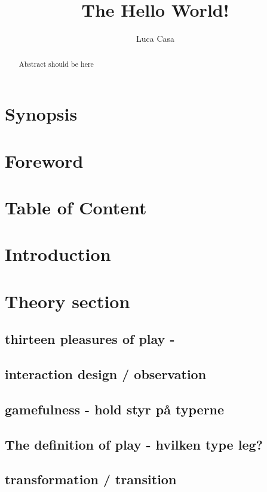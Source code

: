 \documentclass[]{article}
\title{The Hello World!}
\author{Luca Casa}
\begin{document}
\maketitle

\begin{abstract}
Abstract should be here
\end{abstract}

\section{Synopsis}

\section{Foreword}

\section{Table of Content}

\section{Introduction}


\section{Theory section}

\subsection{thirteen pleasures of play - }
\subsection{interaction design / observation}
\subsection{gamefulness - hold styr på typerne}
\subsection{The definition of play - hvilken type leg?}
\subsection{transformation / transition}
\end{document}
